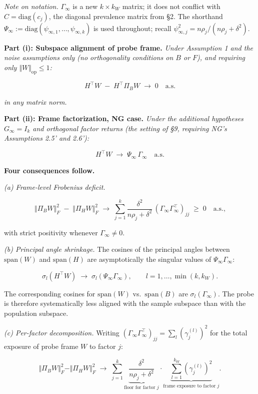 \documentclass{article}
\theoremstyle{remark}
\begin{document}
\textit{Note on notation.} $\Gamma_\infty$ is a new $k \times k_W$ matrix; it does not conflict with $C = \mathrm{diag}(c_j)$, the diagonal prevalence matrix from §2. The shorthand $\Psi_\infty := \mathrm{diag}(\psi_{\infty,1},\ldots,\psi_{\infty,k})$ is used throughout; recall $\psi_{\infty,j}^2 = n\rho_j/(n\rho_j+\delta^2)$.

\textbf{Part (i): Subspace alignment of probe frame.} \textit{Under Assumption 1 and the noise assumptions only (no orthogonality conditions on $B$ or $F$), and requiring only $\Vert W\Vert_{\mathrm{op}} \le 1$:}

\[
H^\top W \;-\; H^\top \Pi_B W \;\longrightarrow\; 0 \quad \text{a.s.}
\]

\textit{in any matrix norm.}

\textbf{Part (ii): Frame factorization, NG case.} \textit{Under the additional hypotheses $G_\infty = I_k$ and orthogonal factor returns (the setting of §9, requiring NG's Assumptions 2.5' and 2.6'):}

\[
H^\top W \;\longrightarrow\; \Psi_\infty\, \Gamma_\infty \quad \text{a.s.}
\]

\textbf{Four consequences follow.}

\textit{(a) Frame-level Frobenius deficit.}

\[
\Vert \Pi_B W\Vert_F^2 \;-\; \Vert \Pi_H W\Vert_F^2 \;\longrightarrow\; \sum_{j=1}^k \frac{\delta^2}{n\rho_j + \delta^2}\,(\Gamma_\infty\Gamma_\infty^\top)_{jj} \;\ge\; 0 \quad \text{a.s.,}
\]

with strict positivity whenever $\Gamma_\infty \ne 0$.

\textit{(b) Principal angle shrinkage.} The cosines of the principal angles between $\mathrm{span}(W)$ and $\mathrm{span}(H)$ are asymptotically the singular values of $\Psi_\infty \Gamma_\infty$:

\[
\sigma_l(H^\top W) \;\longrightarrow\; \sigma_l(\Psi_\infty \Gamma_\infty), \qquad l = 1, \ldots, \min(k, k_W).
\]

The corresponding cosines for $\mathrm{span}(W)$ vs.\ $\mathrm{span}(B)$ are $\sigma_l(\Gamma_\infty)$. The probe is therefore systematically less aligned with the sample subspace than with the population subspace.

\textit{(c) Per-factor decomposition.} Writing $(\Gamma_\infty\Gamma_\infty^\top)_{jj} = \sum_l (\gamma_j^{(l)})^2$ for the total exposure of probe frame $W$ to factor $j$:

\[
\Vert \Pi_B W\Vert_F^2 - \Vert \Pi_H W\Vert_F^2 \;\longrightarrow\; \sum_{j=1}^k \underbrace{\frac{\delta^2}{n\rho_j + \delta^2}}_{\text{floor for factor } j} \cdot \underbrace{\sum_{l=1}^{k_W} (\gamma_j^{(l)})^2}_{\text{frame exposure to factor }j}.
\]
\end{document}
